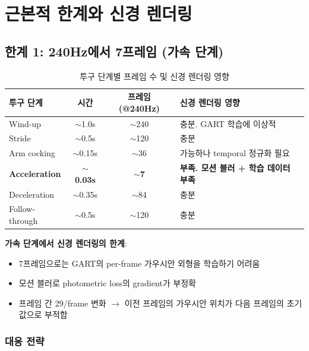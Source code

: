 \documentclass[11pt, a4paper]{report}
\begin{document}
\chapter{근본적 한계와 신경 렌더링}

\section{한계 1: 240Hz에서 7프레임 (가속 단계)}

\begin{table}[H]
\centering
\caption{투구 단계별 프레임 수 및 신경 렌더링 영향}
\renewcommand{\arraystretch}{1.3}
\begin{tabular}{l c c p{5cm}}
\toprule
\textbf{투구 단계} & \textbf{시간} & \textbf{프레임 (@240Hz)} & \textbf{신경 렌더링 영향} \\
\midrule
Wind-up & $\sim$1.0s & $\sim$240 & 충분. GART 학습에 이상적 \\
Stride & $\sim$0.5s & $\sim$120 & 충분 \\
Arm cocking & $\sim$0.15s & $\sim$36 & 가능하나 temporal 정규화 필요 \\
\textbf{Acceleration} & \textbf{$\sim$0.03s} & \textbf{$\sim$7} & \textcolor{hard}{\textbf{부족. 모션 블러 + 학습 데이터 부족}} \\
Deceleration & $\sim$0.35s & $\sim$84 & 충분 \\
Follow-through & $\sim$0.5s & $\sim$120 & 충분 \\
\bottomrule
\end{tabular}
\end{table}

\begin{limitbox}
\textbf{가속 단계에서 신경 렌더링의 한계}:
\begin{itemize}[leftmargin=*]
  \item 7프레임으로는 GART의 per-frame 가우시안 외형을 학습하기 어려움
  \item 모션 블러로 photometric loss의 gradient가 부정확
  \item 프레임 간 29\textdegree/frame 변화 $\rightarrow$ 이전 프레임의 가우시안 위치가 다음 프레임의 초기값으로 부적합
\end{itemize}
\end{limitbox}

\subsection{대응 전략}
\end{document}
